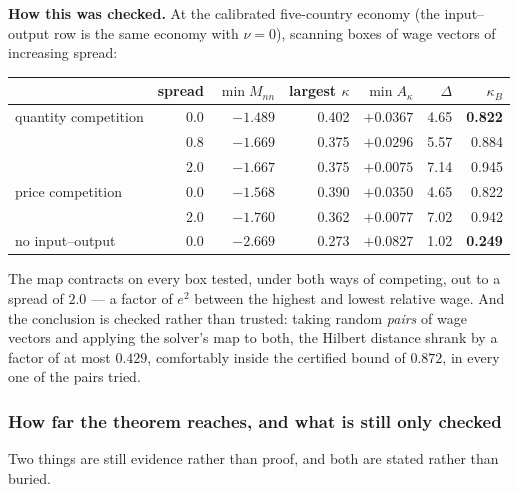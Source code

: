 \documentclass[11pt]{article}
\newcommand{\checked}[1]{\smallskip\noindent\textbf{How this was checked.} #1\smallskip}
\theoremstyle{plain}
\theoremstyle{remark}
\theoremstyle{definition}
\begin{document}
\checked{At the calibrated five-country economy (the input--output row is the same
economy with $\nu=0$), scanning boxes of wage vectors of increasing spread:

\begin{center}
\begin{tabular}{lrrrrrr}
\toprule
 & spread & $\min M_{nn}$ & largest $\kappa$ & $\min A_\kappa$ & $\Delta$ & $\kappa_B$\\
\midrule
quantity competition & 0.0 & $-1.489$ & 0.402 & $+0.0367$ & 4.65 & \textbf{0.822}\\
                     & 0.8 & $-1.669$ & 0.375 & $+0.0296$ & 5.57 & 0.884\\
                     & 2.0 & $-1.667$ & 0.375 & $+0.0075$ & 7.14 & 0.945\\
price competition    & 0.0 & $-1.568$ & 0.390 & $+0.0350$ & 4.65 & 0.822\\
                     & 2.0 & $-1.760$ & 0.362 & $+0.0077$ & 7.02 & 0.942\\
no input--output     & 0.0 & $-2.669$ & 0.273 & $+0.0827$ & 1.02 & \textbf{0.249}\\
\bottomrule
\end{tabular}
\end{center}

\noindent The map contracts on every box tested, under both ways of competing, out to a
spread of $2.0$ --- a factor of $e^{2}$ between the highest and lowest relative wage.
And the conclusion is checked rather than trusted: taking random \emph{pairs} of wage
vectors and applying the solver's map to both, the Hilbert distance shrank by a factor
of at most $0.429$, comfortably inside the certified bound of $0.872$, in every one of
the pairs tried.}

\subsubsection{How far the theorem reaches, and what is still only checked}

Two things are still evidence rather than proof, and both are stated rather than
buried.
\end{document}
